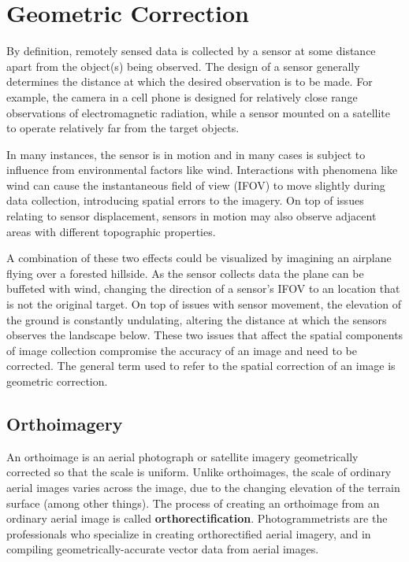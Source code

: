 \documentclass[
]{book}
\begin{document}
\section{Geometric Correction}\label{geometric-correction}

By definition, remotely sensed data is collected by a sensor at some distance apart from the object(s) being observed. The design of a sensor generally determines the distance at which the desired observation is to be made. For example, the camera in a cell phone is designed for relatively close range observations of electromagnetic radiation, while a sensor mounted on a satellite to operate relatively far from the target objects.

In many instances, the sensor is in motion and in many cases is subject to influence from environmental factors like wind. Interactions with phenomena like wind can cause the instantaneous field of view (IFOV) to move slightly during data collection, introducing spatial errors to the imagery. On top of issues relating to sensor displacement, sensors in motion may also observe adjacent areas with different topographic properties.

A combination of these two effects could be visualized by imagining an airplane flying over a forested hillside. As the sensor collects data the plane can be buffeted with wind, changing the direction of a sensor's IFOV to an location that is not the original target. On top of issues with sensor movement, the elevation of the ground is constantly undulating, altering the distance at which the sensors observes the landscape below. These two issues that affect the spatial components of image collection compromise the accuracy of an image and need to be corrected. The general term used to refer to the spatial correction of an image is geometric correction.

\subsection{Orthoimagery}\label{orthoimagery}

An orthoimage is an aerial photograph or satellite imagery geometrically corrected so that the scale is uniform. Unlike orthoimages, the scale of ordinary aerial images varies across the image, due to the changing elevation of the terrain surface (among other things). The process of creating an orthoimage from an ordinary aerial image is called \textbf{orthorectification}. Photogrammetrists are the professionals who specialize in creating orthorectified aerial imagery, and in compiling geometrically-accurate vector data from aerial images.
\end{document}
